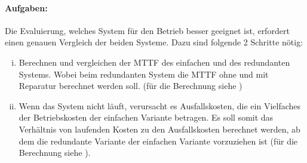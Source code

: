 \documentclass[
            a4paper
            ]{scrartcl}%
\begin{document}
\paragraph{Aufgaben:} Die Evaluierung, welches System für den Betrieb besser geeignet ist,
erfordert einen genauen Vergleich der beiden Systeme. Dazu sind folgende 2
Schritte nötig:
\begin{enumerate}[i)]
    \item Berechnen und vergleichen der MTTF des einfachen und des redundanten Systems. Wobei beim
        redundanten System die MTTF ohne und mit Reparatur berechnet werden
        soll. (für die Berechnung siehe )
    \item Wenn das System nicht läuft, verursacht es Ausfallskosten, die ein
        Vielfaches der Betriebskosten der einfachen Variante betragen. 
        Es soll somit das Verhältnis von laufenden Kosten zu den Ausfallskosten
        berechnet werden, ab dem die redundante Variante der einfachen Variante
        vorzuziehen ist (für die Berechnung siehe ).
\end{enumerate}
\end{document}

